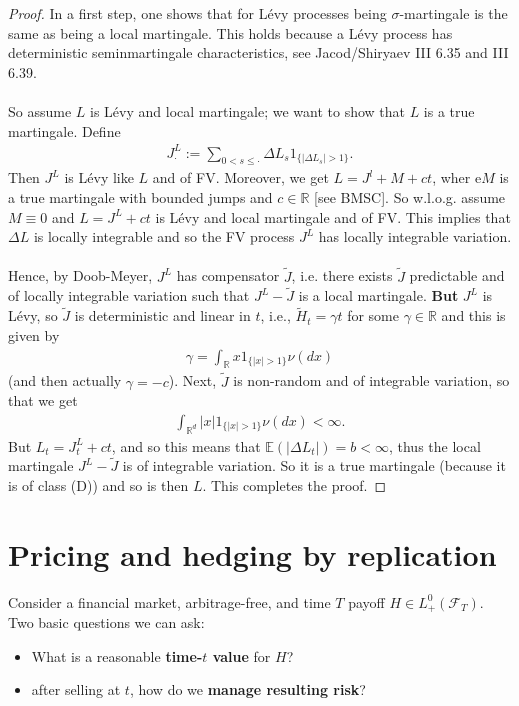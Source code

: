 \documentclass[12pt,a4paper, twoside]{article}
\theoremstyle{definition}
\begin{document}
\begin{proof}
In a first step, one shows that for Lévy processes being $\sigma$-martingale is the same as being a local martingale. This holds because a Lévy process has deterministic seminmartingale characteristics, see Jacod/Shiryaev III 6.35 and III 6.39.
\\\\So assume $L$ is Lévy and local martingale; we want to show that $L$ is a true martingale. Define
\begin{align*}
J_\cdot^L:= \sum_{0 < s \leq \cdot} \Delta L_s 1_{\{| \Delta L_s| > 1 \}}.
\end{align*}
Then $J^L$ is Lévy like $L$ and of FV. Moreover, we get $L=J^l + M + ct$, wher e$M$ is a true martingale with bounded jumps and $c \in \mathbb{R}$  [see BMSC]. So w.l.o.g. assume $M \equiv 0$ and $L=J^L + ct$ is Lévy and local martingale and of FV. This implies that $\Delta L$ is locally integrable and so the FV process $J^L$ has locally integrable variation. \\
\\
Hence, by Doob-Meyer, $J^L$ has compensator $\widetilde{J}$, i.e. there exists $\widetilde{J}$ predictable and of locally integrable variation such that $J^L- \widetilde{J}$ is a local martingale. \textbf{But} $J^L$ is Lévy, so $\widetilde{J}$ is deterministic and linear in $t$, i.e.,  $\widetilde{H}_t = \gamma t$ for some $\gamma \in \mathbb{R}$ and this is given by 
\begin{align*}
\gamma = \int_\mathbb{R} x 1_{\{ |x| > 1\}} \nu (dx)
\end{align*}
(and then actually $\gamma = -c$). 
\newpage
Next, $\widetilde{J}$ is non-random and of integrable variation, so that we get 
\begin{align*}
\int_{\mathbb{R}^d} |x|1_{\{ |x| >1\}} \nu(dx) < \infty.
\end{align*}
But $L_t= J_t^L + ct$, and so this means that $\mathbb{E}( | \Delta L_t|) = b < \infty$, thus the local martingale $J^L- \widetilde{J}$ is of integrable variation. So it is a true martingale (because it is of class (D)) and so is then $L$. This completes the proof. 
\end{proof}
\newpage
\section{Pricing and hedging by replication}
Consider a financial market, arbitrage-free, and time $T$ payoff $H \in L_+^0( \mathcal{F}_T)$. Two basic questions we can ask:
\begin{itemize}
\item What is a reasonable \textbf{time-$t$ value} for $H$?
\item after selling at $t$, how do we \textbf{manage resulting risk}?
\end{itemize}
\end{document}
